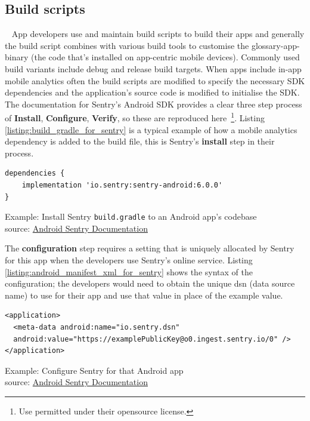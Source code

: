 \subsection{Build scripts}~\label{aata-build-scripts}
App developers use and maintain build scripts to build their apps and generally the build script combines with various build tools to customise the \gls{glossary-app-binary} (the code that's installed on app-centric mobile devices). Commonly used build variants include debug and release build targets. 
When apps include in-app mobile analytics often the build scripts are modified to specify the necessary SDK dependencies and the application's source code is modified to initialise the SDK. The documentation for Sentry's Android SDK provides a clear three step process of \textbf{Install}, \textbf{Configure}, \textbf{Verify}, so these are reproduced here~\footnote{Use permitted under their opensource license.}. Listing \ref{listing:build_gradle_for_sentry} is a typical example of how a mobile analytics dependency is added to the build file, this is Sentry's \textbf{install} step in their process.

\begin{listing}
\begin{verbatim}
dependencies {
    implementation 'io.sentry:sentry-android:6.0.0'
}
\end{verbatim}
\caption[Install Sentry \texttt{build.gradle} to an Android app's codebase]{Example: Install Sentry \texttt{build.gradle} to an Android app's codebase\\source: \href{https://docs.sentry.io/platforms/android/}{Android Sentry Documentation}}
\label{listing:build_gradle_for_sentry}
\end{listing}

The \textbf{configuration} step requires a setting that is uniquely allocated by Sentry for this app when the developers use Sentry's online service. Listing \ref{listing:android_manifest_xml_for_sentry} shows the syntax of the configuration; the developers would need to obtain the unique dsn (data source name) to use for their app and use that value in place of the example value.

\begin{listing}
\begin{verbatim}
<application>
  <meta-data android:name="io.sentry.dsn"
  android:value="https://examplePublicKey@o0.ingest.sentry.io/0" />
</application>
\end{verbatim}
\caption[Configure Sentry for that Android app]{Example: Configure Sentry for that Android app\\source: \href{https://docs.sentry.io/platforms/android/}{Android Sentry Documentation}}
\label{listing:android_manifest_xml_for_sentry}
\end{listing}


